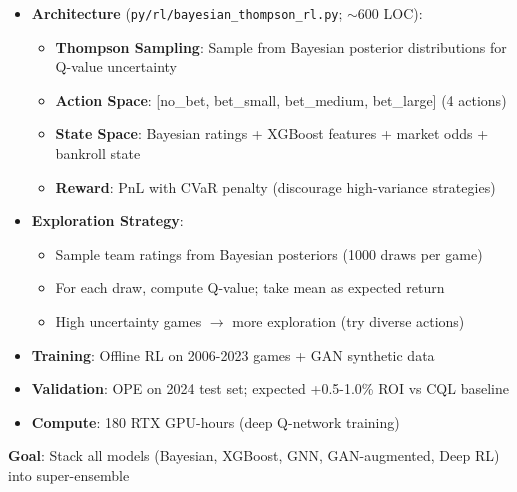 \begin{itemize}
  \item {} \textbf{Architecture} (\texttt{py/rl/bayesian\_thompson\_rl.py}; $\sim$600 LOC):
  \begin{itemize}
    \item \textbf{Thompson Sampling}: Sample from Bayesian posterior distributions for Q-value uncertainty
    \item \textbf{Action Space}: [no\_bet, bet\_small, bet\_medium, bet\_large] (4 actions)
    \item \textbf{State Space}: Bayesian ratings + XGBoost features + market odds + bankroll state
    \item \textbf{Reward}: PnL with CVaR penalty (discourage high-variance strategies)
  \end{itemize}
  \item {} \textbf{Exploration Strategy}:
  \begin{itemize}
    \item Sample team ratings from Bayesian posteriors (1000 draws per game)
    \item For each draw, compute Q-value; take mean as expected return
    \item High uncertainty games $\to$ more exploration (try diverse actions)
  \end{itemize}
  \item {} \textbf{Training}: Offline RL on 2006-2023 games + GAN synthetic data
  \item {} \textbf{Validation}: OPE on 2024 test set; expected +0.5-1.0\% ROI vs CQL baseline
  \item \textbf{Compute}: 180 RTX GPU-hours (deep Q-network training)
\end{itemize}

\textbf{Goal}: Stack all models (Bayesian, XGBoost, GNN, GAN-augmented, Deep RL) into super-ensemble

